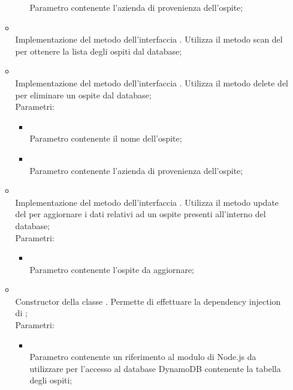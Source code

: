 \begin{itemize}
\begin{itemize}
\begin{itemize}
			Parametro contenente l'azienda di provenienza dell'ospite;
		\end{itemize}
		\item[]  \\
		Implementazione del metodo dell'interfaccia . Utilizza il metodo scan del  per ottenere la lista degli ospiti dal database;\\
		\item[]  \\
		Implementazione del metodo dell'interfaccia . Utilizza il metodo delete del  per eliminare un ospite dal database;\\
		Parametri:
		\begin{itemize}
			\item {} \\
			Parametro contenente il nome dell'ospite;
			\item {} \\
			Parametro contenente l'azienda di provenienza dell'ospite;
		\end{itemize}
		\item[]  \\
		Implementazione del metodo dell'interfaccia . Utilizza il metodo update del  per aggiornare i dati relativi ad un ospite presenti all'interno del database;\\
		Parametri:
		\begin{itemize}
			\item {} \\
			Parametro contenente l'ospite da aggiornare;
		\end{itemize}
		\item[]  \\
		Constructor della classe . Permette di effettuare la dependency injection di ;\\
		Parametri:
		\begin{itemize}
			\item {} \\
			Parametro contenente un riferimento al modulo di Node.js da utilizzare per l'accesso al database DynamoDB contenente la tabella degli ospiti;
		\end{itemize}
	\end{itemize}
\end{itemize}
\FloatBarrier

